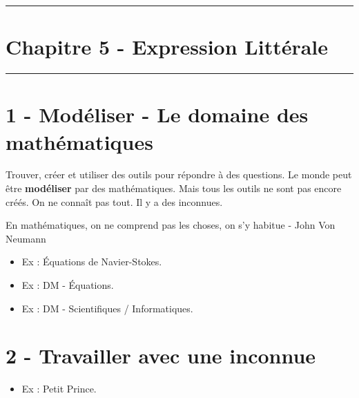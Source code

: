 \documentclass[11pt]{article}
\newcommand{\horrule}[1]{\rule{\linewidth}{#1}} %
\begin{document}

\newtheorem{Definition}{Définition}
\newtheorem{Theorem}{Théorème}
\newtheorem{Proposition}{Propriété}

\renewcommand{\labelitemi}{$\bullet$}
\renewcommand{\labelitemii}{$\circ$}

\setlength{\columnseprule}{1pt}

\horrule{2px}
\section*{Chapitre 5 - Expression Littérale}
\horrule{2px}

\section*{1 - Modéliser - Le domaine des mathématiques}

Trouver, créer et utiliser des outils pour répondre à des questions. Le monde peut être \textbf{modéliser} par des mathématiques. Mais tous les outils ne sont pas encore créés. On ne connaît pas tout. Il y a des inconnues. 

\begin{center}
{\selectfont 
\og En mathématiques, on ne comprend pas les choses, on s'y habitue \fg - John Von Neumann
}
\end{center}

\begin{itemize}
  \item Ex : Équations de Navier-Stokes.
  \item Ex : DM - Équations.
  \item Ex : DM - Scientifiques / Informatiques.
\end{itemize}

\section*{2 - Travailler avec une inconnue}

\begin{itemize}
  \item Ex : Petit Prince.
\end{itemize}
\end{document}
